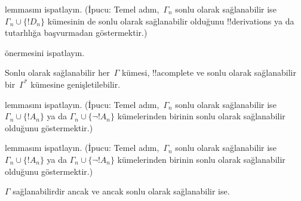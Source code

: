 \begin{prob}
 lemmasını ispatlayın. (İpucu:
Temel adım,~$\Gamma_n$ sonlu olarak sağlanabilir ise
$\Gamma_n\cup\{!D_n\}$ kümesinin de sonlu olarak sağlanabilir olduğunu
!!{derivation}s ya da tutarlılığa başvurmadan göstermektir.)
\end{prob}
\tagendprob


\begin{prob}
 önermesini ispatlayın.
\end{prob}
\tagendprob

\begin{lem}
 Sonlu olarak sağlanabilir her~$\Gamma$
kümesi, !!a{complete} ve sonlu olarak sağlanabilir bir~$\Gamma^*$
kümesine genişletilebilir.
\end{lem}

\begin{prob}
 lemmasını ispatlayın.
(İpucu: Temel adım,~$\Gamma_n$ sonlu olarak sağlanabilir ise
$\Gamma_n\cup\{!A_n\}$ ya da $\Gamma_n\cup\{\lnot !A_n\}$
kümelerinden birinin sonlu olarak sağlanabilir olduğunu göstermektir.)
\end{prob}
\tagendprob

\begin{prob}
 lemmasını ispatlayın.
(İpucu: Temel adım,~$\Gamma_n$ sonlu olarak sağlanabilir ise
$\Gamma_n\cup\{!A_n\}$ ya da $\Gamma_n\cup\{\lnot !A_n\}$
kümelerinden birinin sonlu olarak sağlanabilir olduğunu göstermektir.)
\end{prob}
\tagendprob

\begin{thm}[Tıkızlık]
 $\Gamma$ sağlanabilirdir ancak ve
ancak sonlu olarak sağlanabilir ise.
\end{thm}

